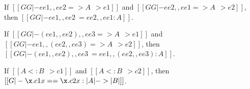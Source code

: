 \begin{corollary} \label{lemma:commu}
  If $[[GG |- ee1 ,, ee2 => A ~~> e1 ]]$ and $[[GG |- ee2 ,, ee1 => A ~~> e2]]$, then
  $[[GG |- ee1 ,, ee2 ~= ee2 ,, ee1 : A]]$.
\end{corollary}


\begin{corollary} \label{lemma:assoc}
  If $[[GG |- (ee1 ,, ee2) ,, ee3 => A ~~> e1 ]]$ and $[[GG |- ee1 ,, (ee2 ,, ee3) => A ~~> e2]]$, then
  $[[GG |- (ee1 ,, ee2) ,, ee3 ~= ee1 ,, (ee2 ,, ee3) : A]]$.
\end{corollary}



\begin{corollary}
  \label{lemma:coercion_same}
  If $[[A <: B ~~> c1]]$ and $[[A <: B ~~> c2]]$, then $[[G |- \x . c1 x == \x . c2 x : | A | -> | B |]]$.
\end{corollary}


